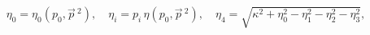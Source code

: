 \begin{equation}\label{15}
 \eta_0 = \eta_0(p_0, \vec{p}\, {}^2), \quad \eta_i =  p_i\, \eta(p_0, \vec{p}\, {}^2),
 \quad \eta_4 = \sqrt{\kappa^2 +\eta_0^2 - \eta_1^2- \eta_2^2- \eta_3^2},
\end{equation}

